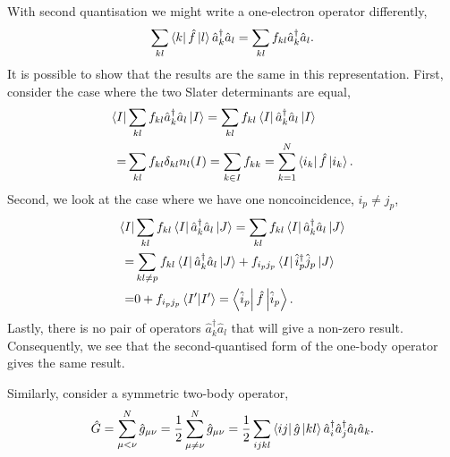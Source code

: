 With second quantisation we might write a one-electron operator differently,
\begin{equation}
    \sum_{kl} \bra{k} \hat{f} \ket{l} \hat{a}^\dagger_k \hat{a}_l
    = \sum_{kl} f_{kl} \hat{a}^\dagger_k \hat{a}_l.
\end{equation}
It is possible to show that the results are the same in this representation. First,
consider the case where the two Slater determinants are equal,
\begin{equation}
    \begin{aligned}
        \bra{I}& \sum_{kl} f_{kl} \hat{a}^\dagger_k \hat{a}_l \ket{I}
        = \sum_{kl} f_{kl} \bra{I} \hat{a}^\dagger_k \hat{a}_l \ket{I} \\
        =& \sum_{kl} f_{kl} \delta_{kl} n_l(I) = \sum_{k \in I} f_{kk}
        = \sum_{k=1}^N \bra{i_k} \hat{f} \ket{i_k}.
    \end{aligned}
\end{equation}
Second, we look at the case where we have one noncoincidence, $i_p \neq j_p$,
\begin{equation}
    \begin{aligned}
        \bra{I}& \sum_{kl}f_{kl} \bra{I} \hat{a}^\dagger_k \hat{a}_l \ket{J}
        = \sum_{kl} f_{kl} \bra{I} \hat{a}^\dagger_k \hat{a}_l\ket{J} \\
        =& \sum_{kl \neq p} f_{kl} \bra{I} \hat{a}^\dagger_k \hat{a}_l \ket{J}
        + f_{i_p j_p} \bra{I} \hat{i}^\dagger_p \hat{j}_p \ket{J} \\
        =& 0 + f_{i_p j_p} \braket{I'} = \bra{\hat{i}_p}\hat{f}\ket{\hat{i}_p}.
    \end{aligned}
\end{equation}
Lastly, there is no pair of operators $\hat{a}^\dagger_k \hat{a}_l$ that will give
a non-zero result. Consequently, we see that the second-quantised form of the
one-body operator gives the same result.

Similarly, consider a symmetric two-body operator,
\begin{equation}
    \hat{G} = \sum_{\mu < \nu}^N \hat{g}_{\mu\nu} 
        = \frac{1}{2} \sum_{\mu \neq \nu}^N \hat{g}_{\mu\nu} \\
        = \frac{1}{2} \sum_{ijkl} \bra{ij} \hat{g} \ket{kl} 
        \hat{a}^\dagger_i \hat{a}^\dagger_j \hat{a}_l \hat{a}_k.
\end{equation}

